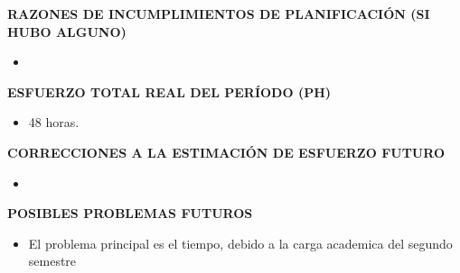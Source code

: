 \documentclass[10pt,letter]{article}
\begin{document}
\vspace{0,5cm}
{\bf RAZONES DE INCUMPLIMIENTOS DE PLANIFICACI\'ON (SI HUBO ALGUNO)}
\begin{itemize}
\item 
\end{itemize}

\vspace{0,5cm}
{\bf ESFUERZO TOTAL REAL DEL PER\'IODO (PH)}
\begin{itemize}
\item 48 horas.
\end{itemize}

\vspace{0,5cm}
{\bf CORRECCIONES A LA ESTIMACI\'ON DE ESFUERZO FUTURO}
\begin{itemize}
\item 
\end{itemize}

\vspace{0,5cm}
{\bf POSIBLES PROBLEMAS FUTUROS}
\begin{itemize}
\item El problema principal es el tiempo, debido a la carga academica del segundo semestre
\end{itemize}
\end{document}
